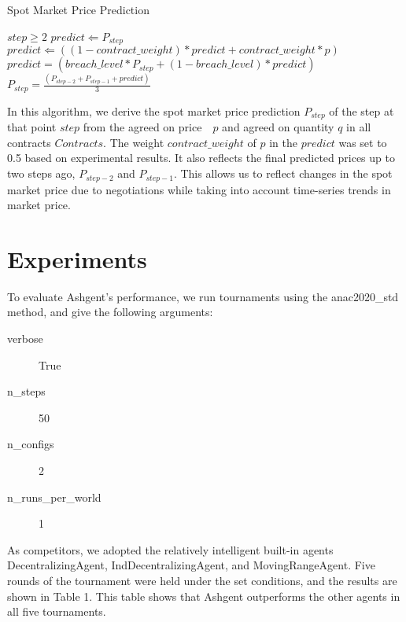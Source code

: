 \documentclass[10pt]{article}
\begin{document}
\begin{algorithm}                      
    \caption{Spot Market Price Prediction}         
    \label{alg1}                          
    \begin{algorithmic}                  
        \REQUIRE $step \geq 2$
        \STATE $predict \Leftarrow P_{step}$
        \STATE $predict \Leftarrow ((1 - contract\_weight) * predict + contract\_weight * p)$
        \ENDFOR
        \STATE $predict = (breach\_level * P_{step} + (1 - breach\_level) * predict)$
        \STATE $P_{step} = \frac{(P_{step-2} + P_{step-1} + predict)}{3}$
        \ENDFOR
    \end{algorithmic}
\end{algorithm}
In this algorithm, we derive the spot market price prediction $P_{step}$ of the step at that point $step$ from the agreed on price　$p$ and agreed on quantity $q$ in all contracts $Contracts$.
The weight $contract\_weight$ of $p$ in the $predict$ was set to 0.5 based on experimental results.
It also reflects the final predicted prices up to two steps ago, $P_{step-2}$ and $P_{step-1}$.
This allows us to reflect changes in the spot market price due to negotiations while taking into account time-series trends in market price.


\section{Experiments}
To evaluate Ashgent's performance, we run tournaments using the anac2020\_std method, and give the following arguments:
\begin{description}
    \item[verbose] True
    \item[n\_steps] 50
    \item[n\_configs] 2
    \item[n\_runs\_per\_world] 1 
\end{description}
As competitors, we adopted the relatively intelligent built-in agents DecentralizingAgent, IndDecentralizingAgent, and MovingRangeAgent.
Five rounds of the tournament were held under the set conditions, and the results are shown in Table 1. %
This table shows that Ashgent outperforms the other agents in all five tournaments.
\end{document}
